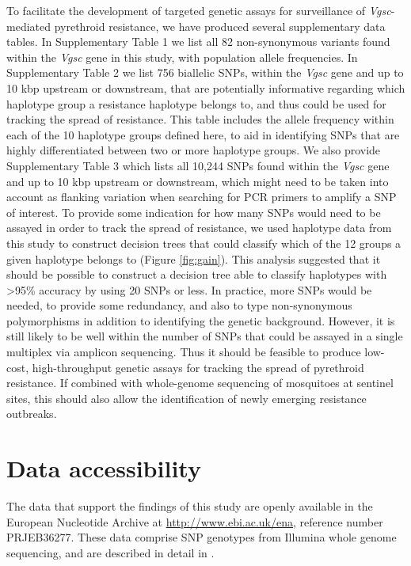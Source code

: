 \documentclass[a4paper,11pt,abstracton,hidelinks]{scrartcl}
\begin{document}
%
To facilitate the development of targeted genetic assays for surveillance of \textit{Vgsc}-mediated pyrethroid resistance, we have produced several supplementary data tables.
%
In Supplementary Table 1 we list all 82 non-synonymous variants found within the \textit{Vgsc} gene in this study, with population allele frequencies.
%
In Supplementary Table 2 we list 756 biallelic SNPs, within the \textit{Vgsc} gene and up to 10 kbp upstream or downstream, that are potentially informative regarding which haplotype group a resistance haplotype belongs to, and thus could be used for tracking the spread of resistance.
%
This table includes the allele frequency within each of the 10 haplotype groups defined here, to aid in identifying SNPs that are highly differentiated between two or more haplotype groups.
%
We also provide Supplementary Table 3 which lists all 10,244 SNPs found within the \textit{Vgsc} gene and up to 10 kbp upstream or downstream, which might need to be taken into account as flanking variation when searching for PCR primers to amplify a SNP of interest.
%
To provide some indication for how many SNPs would need to be assayed in order to track the spread of resistance, we used haplotype data from this study to construct decision trees that could classify which of the 12 groups a given haplotype belongs to (Figure \ref{fig:gain}).
%
This analysis suggested that it should be possible to construct a decision tree able to classify haplotypes with >95\% accuracy by using 20 SNPs or less.
%
In practice, more SNPs would be needed, to provide some redundancy, and also to type non-synonymous polymorphisms in addition to identifying the genetic background.
%
However, it is still likely to be well within the number of SNPs that could be assayed in a single multiplex via amplicon sequencing.
%
Thus it should be feasible to produce low-cost, high-throughput genetic assays for tracking the spread of pyrethroid resistance.
%
If combined with whole-genome sequencing of mosquitoes at sentinel sites, this should also allow the identification of newly emerging resistance outbreaks.
%


\section*{Data accessibility}


The data that support the findings of this study are openly available in the European Nucleotide Archive at \url{http://www.ebi.ac.uk/ena}, reference number PRJEB36277. 
%
These data comprise SNP genotypes from Illumina whole genome sequencing, and are described in detail in \cite{clarkson2019genome}.
\end{document}
